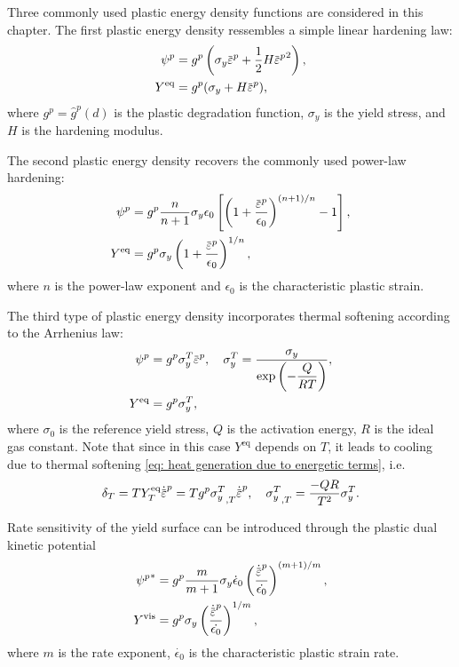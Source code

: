 Three commonly used plastic energy density functions are considered in this chapter. The first plastic energy density ressembles a simple linear hardening law:
\begin{subequations}
  \begin{align}
    \psi^p      & = g^p \left( \sigma_y \ep + \dfrac{1}{2} H \ep^2 \right), \\
    Y^\text{eq} & = g^p (\sigma_y + H \ep),
  \end{align}
\end{subequations}
where $g^p = \hat{g}^p(d)$ is the plastic degradation function, $\sigma_y$ is the yield stress, and $H$ is the hardening modulus.

The second plastic energy density recovers the commonly used power-law hardening:
\begin{subequations}
  \begin{align}
    \psi^p      & = g^p \dfrac{n}{n+1} \sigma_y \epsilon_0 \left[ \left( 1 + \dfrac{\ep}{\epsilon_0} \right)^{(n+1)/n} - 1 \right], \\
    Y^\text{eq} & = g^p \sigma_y \left( 1 + \dfrac{\ep}{\epsilon_0} \right)^{1/n},
  \end{align}
\end{subequations}
where $n$ is the power-law exponent and $\epsilon_0$ is the characteristic plastic strain.

The third type of plastic energy density incorporates thermal softening according to the Arrhenius law:
\begin{subequations}
  \begin{align}
    \psi^p      & = g^p \sigma_y^T \ep, \quad \sigma_y^T = \dfrac{\sigma_y}{\exp\left( -\dfrac{Q}{RT} \right)}, \label{eq: temperature dependent flow stress} \\
    Y^\text{eq} & = g^p \sigma_y^T,
  \end{align}
\end{subequations}
where $\sigma_0$ is the reference yield stress, $Q$ is the activation energy, $R$ is the ideal gas constant. Note that since in this case $Y^\text{eq}$ depends on $T$, it leads to cooling due to thermal softening \eqref{eq: heat generation due to energetic terms}, i.e.
\begin{align}
  \delta_T = TY^\text{eq}_T\epdot = T g^p {\sigma_y^T}_{,T}\epdot, \quad {\sigma_y^T}_{,T} = \dfrac{-QR}{T^2} \sigma_y^T.
\end{align}

Rate sensitivity of the yield surface can be introduced through the plastic dual kinetic potential
\begin{subequations}
  \begin{align}
    {\psi^p}^*   & = g^p \dfrac{m}{m+1} \sigma_y \dot{\epsilon}_0 \left( \dfrac{\epdot}{\dot{\epsilon_0}} \right)^{(m+1)/m}, \\
    Y^\text{vis} & = g^p \sigma_y \left( \dfrac{\epdot}{\dot{\epsilon_0}} \right)^{1/m},
  \end{align}
\end{subequations}
where $m$ is the rate exponent, $\dot{\epsilon_0}$ is the characteristic plastic strain rate.

